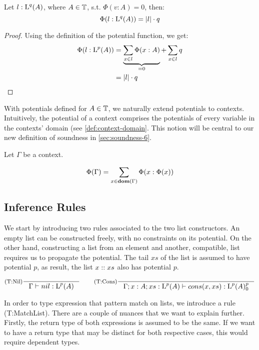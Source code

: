 \begin{corollary}\label{cor:potential-list}
   Let \(l : \text{L}^{q}(A)\), where \(A \in \mathbb{T}\), s.t. \(\Phi(v : A) = 0\), then:
   \[
      \Phi(l : \text{L}^{q}(A)) = |l| \cdot q
   \]
\end{corollary}

\begin{proof}
   Using the definition of the potential function, we get:
   \begin{align*}
      \Phi(l : \text{L}^{p}(A)) &= \underbrace{\sum_{x \in l} \Phi(x : A)}_{=0} + \sum_{x \in l} q \\
                              &= |l| \cdot q
   \end{align*}
\end{proof}

With potentials defined for \(A \in \mathbb{T}\), we naturally extend potentials to contexts. Intuitively, the potential of a context comprises the potentials of every variable in the contexts' domain (see \cref{def:context-domain}. This notion will be central to our new definition of soundness in \cref{sec:soundness-6}.

\begin{definition}
   Let \(\Gamma\) be a context.

   \[
      \Phi(\Gamma) = \sum_{x \in \textbf{dom}(\Gamma)} \Phi(x : \Phi(x))
   \]
\end{definition}

\subsection{Inference Rules}

We start by introducing two rules associated to the two list constructors. An empty list can be constructed freely, with no constraints on its potential. On the other hand, constructing a list from an element and another, compatible, list requires us to propagate the potential. The tail \(xs\) of the list is assumed to have potential \(p\), as result, the list \(x :: xs\) also has potential \(p\). 

\[
   \inference[(T:Nil)]
   {}
   {\typing{\Gamma}{nil}{\ralist{p}{A}}}
   \qquad
   \inference[(T:Cons)]
   {}
   {\typing{\Gamma;x : A; xs : \ralist{p}{A}}{cons(x, xs)}{\ratype{\ralist{p}{A}}{p}{0}}}
\]

In order to type expression that pattern match on lists, we introduce a rule (T:MatchList). There are a couple of nuances that we want to explain further. Firstly, the return type of both expressions is assumed to be the same. If we want to have a return type that may be distinct for both respective cases, this would require dependent types. 

